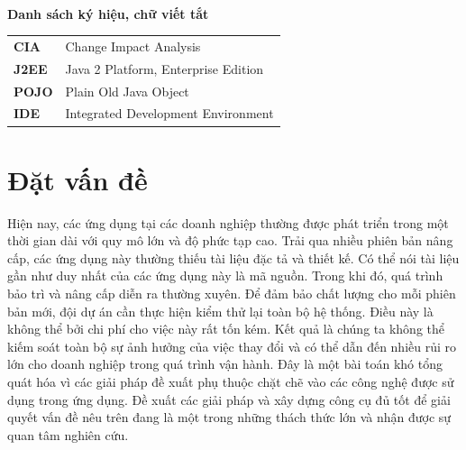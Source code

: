 \documentclass[12pt]{report}
\begin{document}
\newpage
\begin{titlepage}
\tableofcontents
\end{titlepage}

\newpage
\begin{titlepage}
\listoftables

\hfill\\[2cm]

\begin{flushleft}
\bfseries{\Huge{Danh sách ký hiệu, chữ viết tắt}}
\end{flushleft}
\begin{table}[h]
	\centering
	\begin{tabular}{ll}
		\textbf{CIA}  & Change Impact Analysis              \\[0.3cm]
		\textbf{J2EE} & Java 2 Platform, Enterprise Edition \\[0.3cm]
		\textbf{POJO} & Plain Old Java Object              \\[0.3cm]
		\textbf{IDE} & Integrated Development Environment \\[0.3cm]
	\end{tabular}
\end{table}
\end{titlepage}

\newpage
\begin{titlepage}
	\listoffigures
\end{titlepage}

\newpage
\setcounter{page}{1}
\chapter{Đặt vấn đề}
\label{chap:intro}
Hiện nay, các ứng dụng tại các doanh nghiệp thường được phát triển trong một thời gian
dài với quy mô lớn và độ phức tạp cao. Trải qua nhiều phiên bản nâng cấp, các ứng dụng
này thường thiếu tài liệu đặc tả và thiết kế. Có thể nói tài liệu gần như duy nhất của các
ứng dụng này là mã nguồn. Trong khi đó, quá trình bảo trì và nâng cấp diễn ra thường
xuyên. Để đảm bảo chất lượng cho mỗi phiên bản mới, đội dự án cần thực hiện kiểm thử
lại toàn bộ hệ thống. Điều này là không thể bởi chi phí cho việc này rất tốn kém. Kết quả
là chúng ta không thể kiếm soát toàn bộ sự ảnh hưởng của việc thay đổi và có thể dẫn đến
nhiều rủi ro lớn cho doanh nghiệp trong quá trình vận hành. Đây là một bài toán khó tổng
quát hóa vì các giải pháp đề xuất phụ thuộc chặt chẽ vào các công nghệ được sử dụng
trong ứng dụng. Đề xuất các giải pháp và xây dựng công cụ đủ tốt để giải quyết vấn đề
nêu trên đang là một trong những thách thức lớn và nhận được sự quan tâm nghiên cứu.
\end{document}
